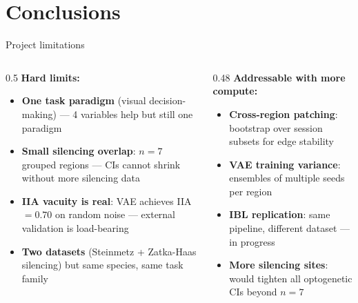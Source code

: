 \documentclass[aspectratio=169,11pt]{beamer}
\begin{document}
\section{Conclusions}

\begin{frame}{Project limitations}
\begin{columns}[T]
\begin{column}{0.5\textwidth}
\textbf{Hard limits:}
\begin{itemize}
  \item \textbf{One task paradigm} (visual decision-making) --- 4 variables help but still one paradigm
  \item \textbf{Small silencing overlap}: $n = 7$ grouped regions --- CIs cannot shrink without more silencing data
  \item \textbf{IIA vacuity is real}: VAE achieves IIA $= 0.70$ on random noise --- external validation is load-bearing
  \item \textbf{Two datasets} (Steinmetz + Zatka-Haas silencing) but same species, same task family
\end{itemize}
\end{column}
\begin{column}{0.48\textwidth}
\textbf{Addressable with more compute:}
\begin{itemize}
  \item \textbf{Cross-region patching}: bootstrap over session subsets for edge stability
  \item \textbf{VAE training variance}: ensembles of multiple seeds per region
  \item \textbf{IBL replication}: same pipeline, different dataset --- in progress
  \item \textbf{More silencing sites}: would tighten all optogenetic CIs beyond $n = 7$
\end{itemize}
\end{column}
\end{columns}
\end{frame}
\end{document}
